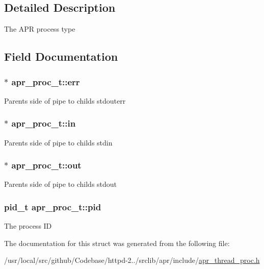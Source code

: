 \subsection{Detailed Description}
The A\+PR process type 

\subsection{Field Documentation}
\subsubsection[{\texorpdfstring{err}{err}}]{$\ast$ apr\+\_\+proc\+\_\+t\+::err}\hypertarget{structapr__proc__t_ad087f812b5c69ce937db4cf6e8cd5a0b}{}\label{structapr__proc__t_ad087f812b5c69ce937db4cf6e8cd5a0b}
Parent\textquotesingle{}s side of pipe to child\textquotesingle{}s stdouterr 
\subsubsection[{\texorpdfstring{in}{in}}]{$\ast$ apr\+\_\+proc\+\_\+t\+::in}\hypertarget{structapr__proc__t_a914bda8939f9d17c9e2f238683fb994b}{}\label{structapr__proc__t_a914bda8939f9d17c9e2f238683fb994b}
Parent\textquotesingle{}s side of pipe to child\textquotesingle{}s stdin 
\subsubsection[{\texorpdfstring{out}{out}}]{$\ast$ apr\+\_\+proc\+\_\+t\+::out}\hypertarget{structapr__proc__t_acb7d7c5226217946d761f0e90ff70d24}{}\label{structapr__proc__t_acb7d7c5226217946d761f0e90ff70d24}
Parent\textquotesingle{}s side of pipe to child\textquotesingle{}s stdout 
\subsubsection[{\texorpdfstring{pid}{pid}}]{\setlength{\rightskip}{0pt plus 5cm}pid\+\_\+t apr\+\_\+proc\+\_\+t\+::pid}\hypertarget{structapr__proc__t_a8a8ee4b234156485a72497023e7482e5}{}\label{structapr__proc__t_a8a8ee4b234156485a72497023e7482e5}
The process ID 

The documentation for this struct was generated from the following file\+:\begin{DoxyCompactItemize}
\item 
/usr/local/src/github/\+Codebase/httpd-\/2../srclib/apr/include/\hyperlink{apr__thread__proc_8h}{apr\+\_\+thread\+\_\+proc.\+h}\end{DoxyCompactItemize}
